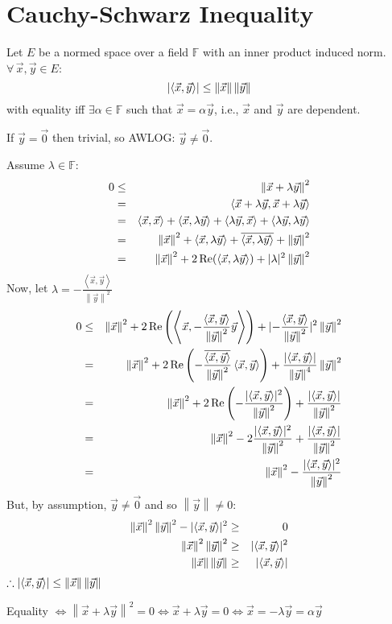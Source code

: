 \documentclass[letterpaper,12pt,fleqn]{article}
\newcommand{\F}{\mathbb{F}}
\newcommand{\vx}{\vec{x}}
\newcommand{\vy}{\vec{y}}
\newcommand{\vo}{\vec{0}}
\newcommand{\norm}[1]{\left\|#1\right\|}
\newcommand{\inner}[2]{\left<#1,#2\right>}
\renewcommand{\a}{\alpha}
\renewcommand{\l}{\lambda}
\newcommand{\conj}[1]{\overline{#1}}
\DeclareMathOperator{\Real}{Re}
\begin{document}
\section*{Cauchy-Schwarz Inequality}

\begin{theorem}
  Let $E$ be a normed space over a field $\F$ with an inner product induced
  norm. $\forall\,\vx,\vy\in E$:
  \[\abs{\inner{\vx}{\vy}}\le\norm{\vx}\norm{\vy}\]
  with equality iff $\exists\a\in\F$ such that $\vx=\a\vy$, i.e., $\vx$ and
  $\vy$ are dependent.
\end{theorem}

\begin{theproof}
  If $\vy=\vo$ then trivial, so AWLOG: $\vy\ne\vo$.

  Assume $\l\in\F$:
  \begin{eqnarray*}
    0 &\le& \norm{\vx+\l\vy}^2 \\
    &=& \inner{\vx+\l\vy}{\vx+\l\vy} \\
    &=& \inner{\vx}{\vx}+\inner{\vx}{\l\vy}+\inner{\l\vy}{\vx}+
    \inner{\l\vy}{\l\vy} \\
    &=& \norm{\vx}^2+\inner{\vx}{\l\vy}+\conj{\inner{\vx}{\l\vy}}+
    \norm{\vy}^2 \\
    &=& \norm{\vx}^2+2\Real(\inner{\vx}{\l\vy})+\abs{\l}^2\norm{\vy}^2
  \end{eqnarray*}
  Now, let $\l=-\frac{\inner{\vx}{\vy}}{\norm{\vy}^2}$
  \begin{eqnarray*}
    0 &\le& \norm{\vx}^2+
    2\Real\left(\inner{\vx}{-\frac{\inner{\vx}{\vy}}{\norm{\vy}^2}\vy}\right)+
    \abs{-\frac{\inner{\vx}{\vy}}{\norm{\vy}^2}}^2\norm{\vy}^2 \\
    &=& \norm{\vx}^2+
    2\Real\left(-\frac{\conj{\inner{\vx}{\vy}}}{\norm{\vy}^2}\inner{\vx}{\vy}
    \right)+\frac{\abs{\inner{\vx}{\vy}}}{\norm{\vy}^4}\norm{\vy}^2 \\
    &=& \norm{\vx}^2+
    2\Real\left(-\frac{\abs{\inner{\vx}{\vy}}^2}{\norm{\vy}^2}\right)+
    \frac{\abs{\inner{\vx}{\vy}}}{\norm{\vy}^2} \\
    &=& \norm{\vx}^2-2\frac{\abs{\inner{\vx}{\vy}}^2}{\norm{\vy}^2}+
    \frac{\abs{\inner{\vx}{\vy}}}{\norm{\vy}^2} \\
    &=& \norm{\vx}^2-\frac{\abs{\inner{\vx}{\vy}}^2}{\norm{\vy}^2} \\
  \end{eqnarray*}
  But, by assumption, $\vy\ne\vo$ and so $\norm{\vy}\ne0$:
  \begin{eqnarray*}
    \norm{\vx}^2\norm{\vy}^2-\abs{\inner{\vx}{\vy}}^2 &\ge& 0 \\
    \norm{\vx}^2\norm{\vy}^2 &\ge& \abs{\inner{\vx}{\vy}}^2 \\
    \norm{\vx}\norm{\vy} &\ge& \abs{\inner{\vx}{\vy}} \\
  \end{eqnarray*}
  $\therefore\abs{\inner{\vx}{\vy}}\le\norm{\vx}\norm{\vy}$

  Equality $\iff\norm{\vx+\l\vy}^2=0\iff\vx+\l\vy=0\iff\vx=-\l\vy=\a\vy$
\end{theproof}
\end{document}
